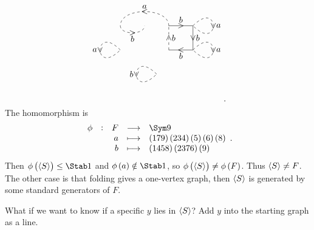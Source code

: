 \begin{example}
$$\begin{tikzpicture}
\draw (0, 1) to node{$ > $} node[above]{$ b $} (1, 1);
\draw (1, 1) to node{$ \vee $} node[right]{$ b $} (1, 0);
\draw (1, 0) to node{$ < $} node[below]{$ b $} (0, 0);
\draw [dashed] (0, 0) to node{$ \wedge $} node[right]{$ b $} (0, 1);
\draw [dashed] (-2, 1) to [in=-90, out=-90] node{$ > $} node[below]{$ b $} (-1, 1);
\draw [dashed] (0, 1) to [in=90, out=90] node{$ < $} node[above]{$ a $} (-2, 1);
\draw [dashed] (1, 1) to [in=-45, out=45, distance=45] node{$ \vee $} node[right]{$ a $} (1, 1);
\draw [dashed] (-2, 0) to [in=-135, out=135, distance=45] node{$ \vee $} node[left]{$ a $} (-2, 0);
\draw [dashed] (1, 0) to [in=-45, out=45, distance=45] node{$ \vee $} node[right]{$ a $} (1, 0);
\draw [dashed] (-0.5, -1) to [in=-135, out=135, distance=45] node{$ \vee $} node[left]{$ b $} (-0.5, -1);
\end{tikzpicture}.
$$
The homomorphism is
$$ \functions[\phi]{F}{\Sym 9}{a}{\br{179}\br{234}\br{5}\br{6}\br{8}}{b}{\br{1458}\br{2376}\br{9}}. $$
Then $ \phi\br{\abr{S}} \le \Stab 1 $ and $ \phi\br{a} \notin \Stab 1 $, so $ \phi\br{\abr{S}} \ne \phi\br{F} $. Thus $ \left\langle S \right\rangle \ne F $. The other case is that folding gives a one-vertex graph, then $ \left\langle S \right\rangle $ is generated by some standard generators of $ F $.
\end{example}

What if we want to know if a specific $ y $ lies in $ \left\langle S \right\rangle $? Add $ y $ into the starting graph as a line.

